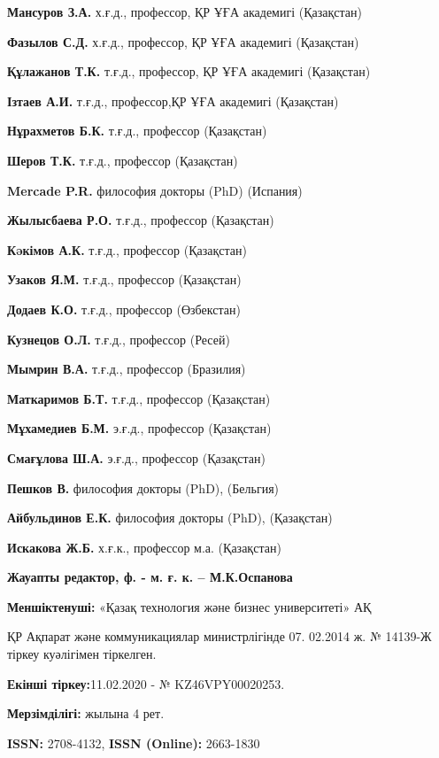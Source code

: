 \textbf{Мансуров З.А.} х.ғ.д., профессор, ҚР ҰҒА академигі (Қазақстан)

\textbf{Фазылов С.Д.} х.ғ.д., профессор, ҚР ҰҒА академигі (Қазақстан)

\textbf{Құлажанов Т.К.} т.ғ.д., профессор, ҚР ҰҒА академигі (Қазақстан)

\textbf{Ізтаев А.И.} т.ғ.д., профессор,ҚР ҰҒА академигі (Қазақстан)

\textbf{Нұрахметов Б.К.} т.ғ.д., профессор (Қазақстан)

\textbf{Шеров Т.К.} т.ғ.д., профессор (Қазақстан)

\textbf{Mercade P.R.} философия докторы (PhD) (Испания)

\textbf{Жылысбаева Р.О.} т.ғ.д., профессор (Қазақстан)

\textbf{Кəкімов А.К.} т.ғ.д., профессор (Қазақстан)

\textbf{Узаков Я.М.} т.ғ.д., профессор (Қазақстан)

\textbf{Додаев К.О.} т.ғ.д., профессор (Өзбекстан)

\textbf{Кузнецов О.Л.} т.ғ.д., профессор (Ресей)

\textbf{Мымрин В.А.} т.ғ.д., профессор (Бразилия)

\textbf{Маткаримов Б.Т.} т.ғ.д., профессор (Қазақстан)

\textbf{Мұхамедиев Б.М.} э.ғ.д., профессор (Қазақстан)

\textbf{Смағұлова Ш.А.} э.ғ.д., профессор (Қазақстан)

\textbf{Пешков В.} философия докторы (PhD), (Бельгия)

\textbf{Айбульдинов Е.К.} философия докторы (PhD), (Қазақстан)

\textbf{Искакова Ж.Б.} х.ғ.к., профессор м.а. (Қазақстан)

\begin{center}
\textbf{Жауапты редактор, ф. - м. ғ. к. -- М.К.Оспанова}
\end{center}

\textbf{Меншіктенуші:} «Қазақ технология және бизнес университеті» АҚ

ҚР Ақпарат және коммуникациялар министрлігінде 07. 02.2014 ж. № 14139-Ж
тіркеу куәлігімен тіркелген.

\textbf{Екінші тіркеу:}11.02.2020 - № KZ46VPY00020253.

\textbf{Мерзімділігі:} жылына 4 рет.

\textbf{ISSN:} 2708-4132, \textbf{ISSN (Online):} 2663-1830

